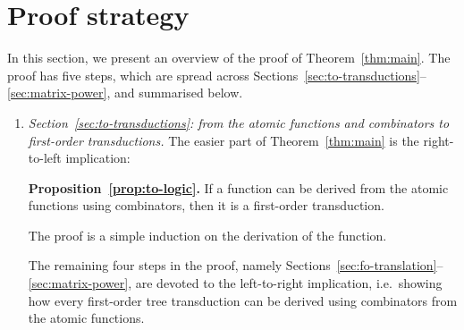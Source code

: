 \section{Proof strategy}
\label{sec:strategy}
In this section, we present an overview of the proof of Theorem~\ref{thm:main}. The proof has five steps, which are spread across Sections~\ref{sec:to-transductions}--\ref{sec:matrix-power}, and summarised below.

\newcommand{\announce}[2]{
\begin{center}
    {\bf #1.} #2
\end{center}
}
\begin{enumerate}
\item \emph{Section~\ref{sec:to-transductions}: from the atomic functions and combinators to first-order transductions.} The easier part of Theorem~\ref{thm:main} is the  right-to-left implication:
\announce
{Proposition~\ref{prop:to-logic}}
{If a function can be derived from the atomic functions using combinators, then it is a first-order transduction.}
 The proof is a simple induction on the derivation of the function.
 
 The remaining four steps in the proof, namely Sections~\ref{sec:fo-translation}--\ref{sec:matrix-power}, are devoted to the left-to-right implication, i.e.~showing how every first-order tree transduction can be derived using combinators from the atomic functions.


\end{enumerate}
